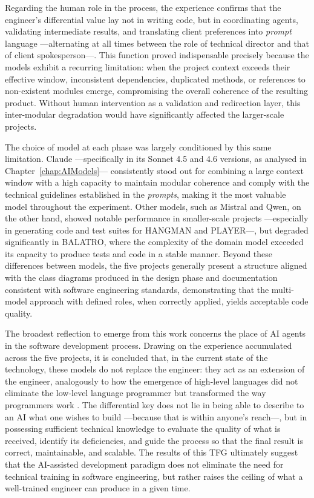 Regarding the human role in the process, the experience confirms that the engineer's differential value lay not in writing code, but in coordinating agents, validating intermediate results, and translating client preferences into \textit{prompt} language ---alternating at all times between the role of technical director and that of client spokesperson---. This function proved indispensable precisely because the models exhibit a recurring limitation: when the project context exceeds their effective window, inconsistent dependencies, duplicated methods, or references to non-existent modules emerge, compromising the overall coherence of the resulting product. Without human intervention as a validation and redirection layer, this inter-modular degradation would have significantly affected the larger-scale projects.

The choice of model at each phase was largely conditioned by this same limitation. Claude ---specifically in its Sonnet 4.5 and 4.6 versions, as analysed in Chapter~\ref{chap:AIModels}--- consistently stood out for combining a large context window with a high capacity to maintain modular coherence and comply with the technical guidelines established in the \textit{prompts}, making it the most valuable model throughout the experiment. Other models, such as Mistral and Qwen, on the other hand, showed notable performance in smaller-scale projects ---especially in generating code and test suites for \ac{HANGMAN} and \ac{PLAYER}---, but degraded significantly in \ac{BALATRO}, where the complexity of the domain model exceeded its capacity to produce tests and code in a stable manner. Beyond these differences between models, the five projects generally present a structure aligned with the class diagrams produced in the design phase and documentation consistent with software engineering standards, demonstrating that the multi-model approach with defined roles, when correctly applied, yields acceptable code quality.

The broadest reflection to emerge from this work concerns the place of \ac{AI} agents in the software development process. Drawing on the experience accumulated across the five projects, it is concluded that, in the current state of the technology, these models do not replace the engineer: they act as an extension of the engineer, analogously to how the emergence of high-level languages did not eliminate the low-level language programmer but transformed the way programmers work \cite{Welsh:2023:TEoP}. The differential key does not lie in being able to describe to an \ac{AI} what one wishes to build ---because that is within anyone's reach---, but in possessing sufficient technical knowledge to evaluate the quality of what is received, identify its deficiencies, and guide the process so that the final result is correct, maintainable, and scalable. The results of this \ac{TFG} ultimately suggest that the \ac{AI}-assisted development paradigm does not eliminate the need for technical training in software engineering, but rather raises the ceiling of what a well-trained engineer can produce in a given time.

